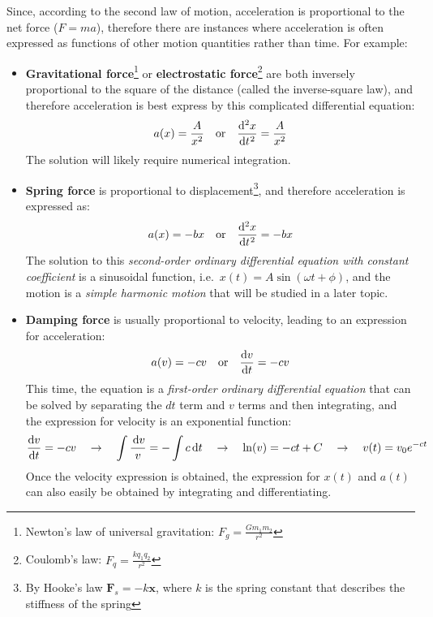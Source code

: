 \documentclass{../../oss-handout}
\begin{document}
Since, according to the second law of motion, acceleration is proportional to
the net force ($F=ma$), therefore there are instances where acceleration is
often expressed as functions of other motion quantities rather than time. For
example:
\begin{itemize}[leftmargin=15pt]
\item\textbf{Gravitational force}\footnote{Newton's law of universal
  gravitation: $\displaystyle F_g=\frac{Gm_1m_2}{r^2}$} or
  \textbf{electrostatic force}\footnote{Coulomb's law:
    $\displaystyle F_q=\frac{kq_1q_2}{r^2}$} are both inversely proportional to
  the square of the distance (called the inverse-square law), and therefore
  acceleration is best express by this complicated differential equation:
  \begin{equation*}
    a(x)=\frac{A}{x^2} \quad\text{or}\quad \diff[2] xt=\frac{A}{x^2}
  \end{equation*}
  The solution will likely require numerical integration.

\item\textbf{Spring force} is proportional to displacement\footnote{By Hooke's
  law $\bm{F}_s=-k\bm{x}$, where $k$ is the spring constant that describes the
  stiffness of the spring}, and therefore acceleration is expressed as:
  \begin{equation*}
    a(x)=-bx\quad\text{or}\quad \diff[2] xt=-bx
  \end{equation*}
  The solution to this \emph{second-order ordinary differential equation with
    constant coefficient} is a sinusoidal function, i.e.\
  $x(t)=A\sin(\omega t+\phi)$, and the motion is a \emph{simple harmonic
    motion} that will be studied in a later topic.

\item\textbf{Damping force}  is usually proportional to velocity, leading
  to an expression for acceleration:
  \begin{equation*}
    a(v)=-cv\quad\text{or}\quad \diff vt=-cv
  \end{equation*}
  This time, the equation is a \emph{first-order ordinary differential equation}
  that can be solved by separating the $dt$ term and $v$ terms and then
  integrating, and the expression for velocity is an exponential function:
  \begin{equation*}
    \diff vt=-cv\quad\rightarrow\quad \int\frac{\dl v}{v}=-\int c\dl t
    \quad\rightarrow\quad \ln(v)=-ct+C
    \quad\rightarrow\quad v(t)=v_0e^{-ct}
  \end{equation*}
  Once the velocity expression is obtained, the expression for $x(t)$ and
  $a(t)$ can also easily be obtained by integrating and differentiating.


\end{itemize}
\end{document}
